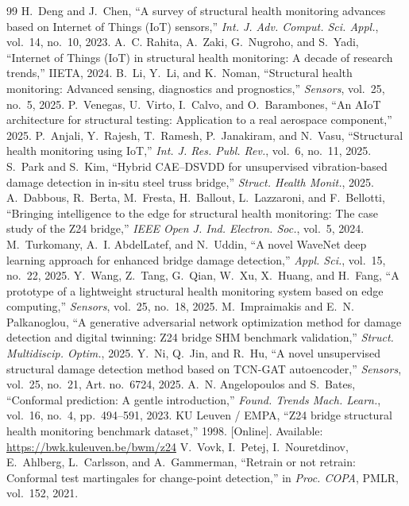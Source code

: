 \documentclass[conference]{IEEEtran}
\begin{document}
\begin{thebibliography}{99}
 H.~Deng and J.~Chen, ``A survey of structural health monitoring advances based on Internet of Things (IoT) sensors,'' \emph{Int. J. Adv. Comput. Sci. Appl.}, vol.~14, no.~10, 2023.
 A.~C. Rahita, A.~Zaki, G.~Nugroho, and S.~Yadi, ``Internet of Things (IoT) in structural health monitoring: A decade of research trends,'' IIETA, 2024.
 B.~Li, Y.~Li, and K.~Noman, ``Structural health monitoring: Advanced sensing, diagnostics and prognostics,'' \emph{Sensors}, vol.~25, no.~5, 2025.
 P.~Venegas, U.~Virto, I.~Calvo, and O.~Barambones, ``An AIoT architecture for structural testing: Application to a real aerospace component,'' 2025.
 P.~Anjali, Y.~Rajesh, T.~Ramesh, P.~Janakiram, and N.~Vasu, ``Structural health monitoring using IoT,'' \emph{Int. J. Res. Publ. Rev.}, vol.~6, no.~11, 2025.
 S.~Park and S.~Kim, ``Hybrid CAE--DSVDD for unsupervised vibration-based damage detection in in-situ steel truss bridge,'' \emph{Struct. Health Monit.}, 2025.
 A.~Dabbous, R.~Berta, M.~Fresta, H.~Ballout, L.~Lazzaroni, and F.~Bellotti, ``Bringing intelligence to the edge for structural health monitoring: The case study of the Z24 bridge,'' \emph{IEEE Open J. Ind. Electron. Soc.}, vol.~5, 2024.
 M.~Turkomany, A.~I. AbdelLatef, and N.~Uddin, ``A novel WaveNet deep learning approach for enhanced bridge damage detection,'' \emph{Appl. Sci.}, vol.~15, no.~22, 2025.
 Y.~Wang, Z.~Tang, G.~Qian, W.~Xu, X.~Huang, and H.~Fang, ``A prototype of a lightweight structural health monitoring system based on edge computing,'' \emph{Sensors}, vol.~25, no.~18, 2025.
 M.~Impraimakis and E.~N. Palkanoglou, ``A generative adversarial network optimization method for damage detection and digital twinning: Z24 bridge SHM benchmark validation,'' \emph{Struct. Multidiscip. Optim.}, 2025.
 Y.~Ni, Q.~Jin, and R.~Hu, ``A novel unsupervised structural damage detection method based on TCN-GAT autoencoder,'' \emph{Sensors}, vol.~25, no.~21, Art. no.~6724, 2025.
 A.~N. Angelopoulos and S.~Bates, ``Conformal prediction: A gentle introduction,'' \emph{Found. Trends Mach. Learn.}, vol.~16, no.~4, pp.~494--591, 2023.
 KU Leuven / EMPA, ``Z24 bridge structural health monitoring benchmark dataset,'' 1998. [Online]. Available: \url{https://bwk.kuleuven.be/bwm/z24}
 V.~Vovk, I.~Petej, I.~Nouretdinov, E.~Ahlberg, L.~Carlsson, and A.~Gammerman, ``Retrain or not retrain: Conformal test martingales for change-point detection,'' in \emph{Proc. COPA}, PMLR, vol.~152, 2021.

\end{thebibliography}
\end{document}
